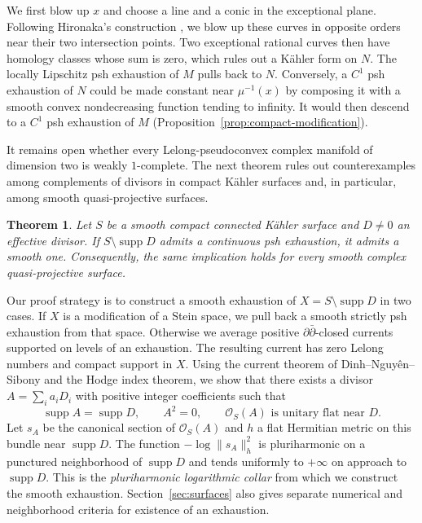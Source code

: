 \documentclass[11pt]{amsart}
\newtheorem{theorem}{Theorem}[section]
\theoremstyle{definition}
\theoremstyle{remark}
\numberwithin{equation}{section}
\newcommand{\OO}{\mathcal O}
\newcommand{\barp}{\bar\partial}
\newcommand{\supp}{\operatorname{supp}}
\begin{document}
We first blow up $x$ and choose a line and a conic in the exceptional
plane. Following Hironaka's construction \cite[\S6]{Barlet2015}, we
blow up these curves in opposite orders near their two intersection
points. Two exceptional rational curves then have homology classes
whose sum is zero, which rules out a K\"ahler form on $N$.
The locally Lipschitz psh exhaustion of $M$ pulls back to $N$.
Conversely, a $C^1$ psh exhaustion of $N$ could be made constant
near $\mu^{-1}(x)$ by composing it with a smooth convex nondecreasing
function tending to infinity. It would then descend to a $C^1$ psh
exhaustion of $M$ (Proposition~\ref{prop:compact-modification}).

It remains open whether every Lelong-pseudoconvex complex manifold of
dimension two is weakly $1$-complete. The next theorem rules
out counterexamples among complements of divisors in compact
K\"ahler surfaces and, in particular, among smooth quasi-projective
surfaces.

\begin{theorem}\label{thm:surface-introduction}
Let $S$ be a smooth compact connected K\"ahler surface and $D\ne0$
an effective divisor. If $S\setminus\supp D$ admits a continuous
psh exhaustion, it admits a smooth one. Consequently, the same
implication holds for every smooth complex quasi-projective surface.
\end{theorem}

Our proof strategy is to construct a smooth exhaustion of
$X=S\setminus\supp D$ in two cases. If $X$ is a modification of a
Stein space, we pull back a smooth strictly psh exhaustion from that
space. Otherwise we average positive $\partial\barp$-closed currents
supported on levels of an exhaustion. The resulting current has zero
Lelong numbers and compact support in $X$. Using the current theorem
of Dinh--Nguy\^en--Sibony \cite{DNS22} and the Hodge index theorem,
we show that there exists a divisor $A=\sum_i a_iD_i$ with positive
integer coefficients such that
\[
\supp A=\supp D,\qquad A^2=0,\qquad
\OO_S(A)\text{ is unitary flat near }D.
\]
Let $s_A$ be the canonical section of $\OO_S(A)$ and $h$ a flat
Hermitian metric on this bundle near $\supp D$. The function $-\log\|s_A\|_h^2$
is pluriharmonic on a punctured neighborhood of $\supp D$ and tends
uniformly to $+\infty$ on approach to $\supp D$. This is the
\emph{pluriharmonic logarithmic collar} from which we construct the
smooth exhaustion.
Section~\ref{sec:surfaces} also gives separate numerical and
neighborhood criteria for existence of an exhaustion.
\end{document}
